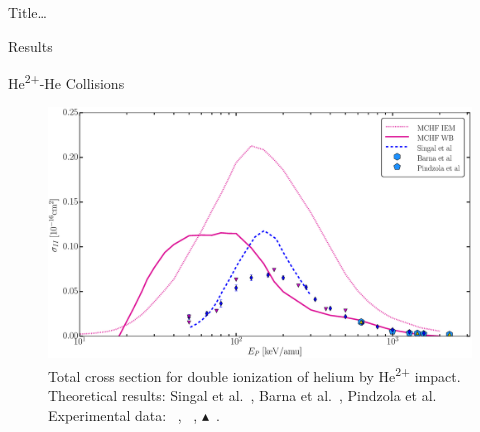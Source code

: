\documentclass[letterpaper, 11 pt]{report}
\begin{document}
\begin{chapter}{ Title\dots \label{chap:p-he2p-he}}
\begin{section}{Results \label{sec:phe2p-res}}
\begin{subsection}{\texorpdfstring{He\textsuperscript{2+}}{He2+}-He Collisions 
                         \label{sec:he2phe-res}}
         \begin{figure}[t]
            \centering
            \includegraphics[width = 0.95 \linewidth]{./images/he2phe/he2phe-II.eps}
            \caption[Total cross section for double ionization of helium by He\textsuperscript{2+}
                     impact.]{Total cross section for double ionization of helium by
                     He\textsuperscript{2+} impact. Theoretical results: Singal
                     et al.~\cite{SL-91}, Barna
                     et al.~\cite{BTB-05}, Pindzola et al.~\cite{PRC-07}
                     Experimental data: {\color{blue}{$\blacklozenge$}}~\cite{SG85},
                     {\color{RedViolet}{$\blacktriangledown$}}~\cite{Dubois87},
                     {\color{GreenYellow}$\blacktriangle$}~\cite{KAH84}. \label{fig:he2phe-ii}}
         \end{figure}


\end{subsection}
\end{section}
\end{chapter}
\end{document}
